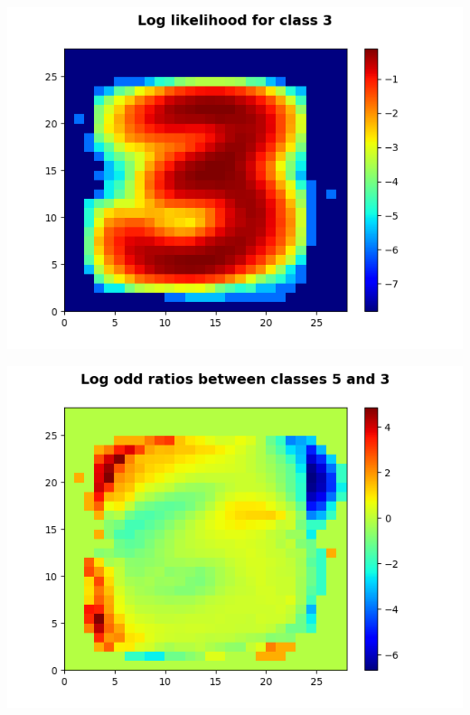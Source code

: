 \documentclass[11pt]{article}
\begin{document}
\begin{center}
\includegraphics[scale=0.75]{part1/1/log_likelihood_3.png}
\end{center}

\begin{center}
\includegraphics[scale=1]{part1/1/odd_ratio_5_3.png}
\end{center}
\end{document}
